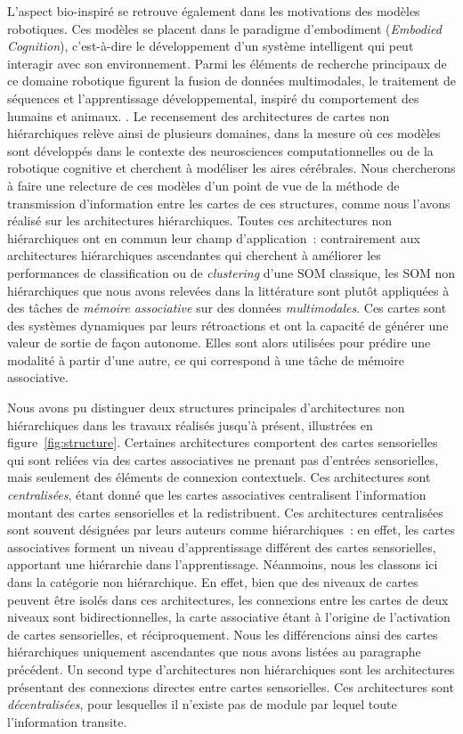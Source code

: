\documentclass[../main]{subfiles}
\begin{document}
L'aspect bio-inspiré se retrouve également dans les motivations des modèles robotiques. Ces modèles se placent dans le paradigme d'embodiment (\emph{Embodied Cognition}), c'est-à-dire le développement d'un système intelligent qui peut interagir avec son environnement. Parmi les éléments de recherche principaux de ce domaine robotique figurent la fusion de données multimodales, le traitement de séquences et l'apprentissage développemental, inspiré du comportement des humains et animaux. \parencite{Smith2005TheDO}.
Le recensement des architectures de cartes non hiérarchiques relève ainsi de plusieurs domaines, dans la mesure où ces modèles sont développés dans le contexte des neurosciences computationnelles ou de la robotique cognitive et cherchent à modéliser les aires cérébrales. 
Nous chercherons à faire une relecture de ces modèles d'un point de vue de la méthode de transmission d'information entre les cartes de ces structures, comme nous l'avons réalisé sur les architectures hiérarchiques.
Toutes ces architectures non hiérarchiques ont en commun leur champ d'application~: contrairement aux architectures hiérarchiques ascendantes qui cherchent à améliorer les performances de classification ou de \emph{clustering} d'une SOM classique, les SOM non hiérarchiques que nous avons relevées dans la littérature sont plutôt appliquées à des tâches de \emph{mémoire associative} sur des données \emph{multimodales}.
Ces cartes sont des systèmes dynamiques par leurs rétroactions et ont la capacité de générer une valeur de sortie de façon autonome. Elles sont alors utilisées pour prédire une modalité à partir d'une autre, ce qui correspond à une tâche de mémoire associative.


Nous avons pu distinguer deux structures principales d'architectures non hiérarchiques dans les travaux réalisés jusqu'à présent, illustrées en figure~\ref{fig:structure}.
Certaines architectures comportent des cartes sensorielles qui sont reliées via des cartes associatives ne prenant pas d'entrées sensorielles, mais seulement des éléments de connexion contextuels. 
Ces architectures sont \emph{centralisées}, étant donné que les cartes associatives centralisent l'information  montant des cartes sensorielles et la redistribuent. Ces architectures centralisées sont souvent désignées par leurs auteurs comme hiérarchiques~: en effet, les cartes associatives forment un niveau d'apprentissage différent des cartes sensorielles, apportant une hiérarchie dans l'apprentissage. 
Néanmoins, nous les classons ici dans la catégorie non hiérarchique. 
En effet, bien que des niveaux de cartes peuvent être isolés dans ces architectures, les connexions entre les cartes de deux niveaux sont bidirectionnelles, la carte associative étant à l'origine de l'activation de cartes sensorielles, et réciproquement.
Nous les différencions ainsi des cartes hiérarchiques uniquement ascendantes que nous avons listées au paragraphe précédent.
Un second type d'architectures non hiérarchiques sont les architectures présentant des connexions directes entre cartes sensorielles. Ces architectures sont \emph{décentralisées}, pour lesquelles il n'existe pas de module par lequel toute l'information transite.
\end{document}
